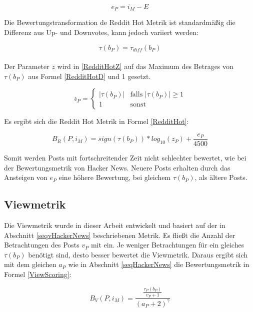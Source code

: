 \begin{equation}
\label{RedditHotT}
e_{P} = i_{M} - E  
\end{equation}

Die Bewertungstransformation de Reddit Hot Metrik ist standardmäßig die  Differenz aus Up- und Downvotes, kann jedoch variiert werden:

\begin{equation}
\label{RedditHotD}
\tau(b_{P}) = \tau_{diff}(b_{P})
\end{equation}
\\
Der Parameter $z$ wird in \ref{RedditHotZ} auf das Maximum des Betrages von $ \tau(b_{P})$ aus Formel \ref{RedditHotD} und 1 gesetzt.

\begin{equation}
\label{RedditHotZ}
z_{P}  = \begin{cases}
|\tau(b_{P})| &\text{falls $|\tau(b_{P})| \geq 1$}\\
1 &\text{sonst}
\end{cases}
\end{equation}

Es ergibt sich die Reddit Hot Metrik in Formel \ref{RedditHot}:

\begin{equation}
\label{RedditHot}
B_R(P,i_M) = sign(\tau(b_{P})) * log_{10}(z_{P}) + \frac{e_{P}}{4500}
\end{equation}

Somit werden Posts mit fortschreitender Zeit nicht schlechter bewertet, wie bei der Bewertungsmetrik von Hacker News. Neuere Posts erhalten durch das Ansteigen von $e_P$ eine höhere Bewertung, bei gleichem $\tau(b_P)$, als ältere Posts. 
 

\subsection{Viewmetrik}

Die Viewmetrik wurde in dieser Arbeit entwickelt und basiert auf der in Abschnitt \ref{seqvHackerNews} beschriebenen Metrik. Es fließt die Anzahl der Betrachtungen des Posts $v_P$ mit ein. Je weniger Betrachtungen für ein gleiches $\tau(b_P)$ benötigt sind, desto besser bewertet die Viewmetrik. Daraus ergibt sich mit dem gleichen $a_P$ wie in Abschnitt \ref{seqHackerNews}  die Bewertungsmetrik in Formel \ref{ViewScoring}:

\begin{equation}
\label{ViewScoring}
B_V(P,i_M) = \frac{\frac{\tau_{P}(b_P)}{v_{P} + 1}}{(a_{P} + 2)^{\gamma}}
\end{equation}

